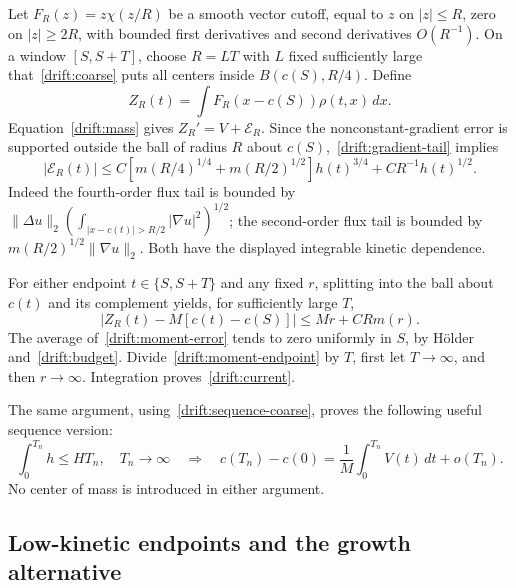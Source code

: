 Let $F_R(z)=z\chi(z/R)$ be a smooth vector cutoff, equal to $z$ on $|z|\le R$, zero on $|z|\ge2R$, with bounded first derivatives and second derivatives $O(R^{-1})$. On a window $[S,S+T]$, choose $R=LT$ with $L$ fixed sufficiently large that~\eqref{drift:coarse} puts all centers inside $B(c(S),R/4)$. Define
\[
 Z_R(t)=\int F_R(x-c(S))\rho(t,x)\,dx.
\]
Equation~\eqref{drift:mass} gives $Z_R'=V+\mathcal E_R$. Since the nonconstant-gradient error is supported outside the ball of radius $R$ about $c(S)$,~\eqref{drift:gradient-tail} implies
\begin{equation}\label{drift:moment-error}
 |\mathcal E_R(t)|\le C\left[m(R/4)^{1/4}+m(R/2)^{1/2}\right]h(t)^{3/4}
                         +C R^{-1}h(t)^{1/2}.
\end{equation}
Indeed the fourth-order flux tail is bounded by
$\|\Delta u\|_2(\int_{|x-c(t)|>R/2}|\nabla u|^2)^{1/2}$; the second-order flux tail is bounded by
$m(R/2)^{1/2}\|\nabla u\|_2$. Both have the displayed integrable kinetic dependence.

For either endpoint $t\in\{S,S+T\}$ and any fixed $r$, splitting into the ball about $c(t)$ and its complement yields, for sufficiently large $T$,
\begin{equation}\label{drift:moment-endpoint}
 |Z_R(t)-M[c(t)-c(S)]|\le Mr+C Rm(r).
\end{equation}
The average of~\eqref{drift:moment-error} tends to zero uniformly in $S$, by H\"older and~\eqref{drift:budget}. Divide~\eqref{drift:moment-endpoint} by $T$, first let $T\to\infty$, and then $r\to\infty$. Integration proves~\eqref{drift:current}.

The same argument, using~\eqref{drift:sequence-coarse}, proves the following useful sequence version:
\begin{equation}\label{drift:sequence-current}
 \int_0^{T_n}h\le H T_n,\quad T_n\to\infty
 \quad\Longrightarrow\quad
 c(T_n)-c(0)=\frac1M\int_0^{T_n}V(t)\,dt+o(T_n).
\end{equation}
No center of mass is introduced in either argument.

\subsection{Low-kinetic endpoints and the growth alternative}

